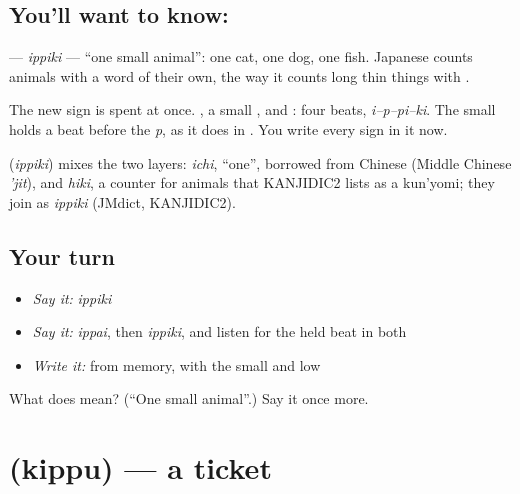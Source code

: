 \subsection*{You'll want to know: }
\textbf{} — \emph{ippiki} — \textquotedblleft{}one small animal\textquotedblright{}: one cat, one dog, one fish. Japanese counts animals with a word of their own, the way it counts long thin things with \textbf{}.

The new sign is spent at once. \textbf{}, a small \textbf{}, \textbf{} and \textbf{}: four beats, \emph{i–p–pi–ki}. The small \textbf{} holds a beat before the \emph{p}, as it does in \textbf{}. You write every sign in it now.

\begin{cousinweb}
\textbf{} (\emph{ippiki}) mixes the two layers: \emph{ichi}, \textquotedblleft{}one\textquotedblright{}, borrowed from Chinese (Middle Chinese \emph{'jit}), and \emph{hiki}, a counter for animals that KANJIDIC2 lists as a kun'yomi; they join as \emph{ippiki} (JMdict, KANJIDIC2).
\end{cousinweb}

\subsection*{Your turn}
\begin{itemize}
\raggedright
  \item \emph{Say it:} \emph{ippiki}
  \item \emph{Say it:} \emph{ippai}, then \emph{ippiki}, and listen for the held beat in both
  \item \emph{Write it:} \textbf{} from memory, with the \textbf{} small and low
\end{itemize}

\begin{tcolorbox}[breakable,colback=teal!4,colframe=teal!35!black,title={Before you move on}]
What does  mean? (\textquotedblleft{}One small animal\textquotedblright{}.) Say it once more.
\end{tcolorbox}
\section[\texorpdfstring{\ja{きっぷ} (kippu)}{きっぷ (kippu)}]{ (kippu) — a ticket}

\label{lesson:JA-C137-kippu}



